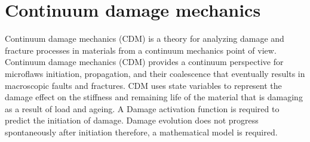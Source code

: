 \documentclass[a4paper,12pt,twoside]{report}
\begin{document}
\chapter{Continuum damage mechanics}
\indent\indent\indent Continuum damage mechanics (CDM) is a theory for analyzing damage and fracture processes in materials from a continuum mechanics point of view. Continuum damage mechanics (CDM) provides a continuum perspective for microflaws initiation, propagation, and their coalescence that eventually results in macroscopic faults and fractures. CDM uses state variables to represent the damage effect on the stiffness and remaining life of the material that is damaging as a result of load and ageing. A Damage activation function is required to predict the initiation of damage. Damage evolution does not progress spontaneously after initiation therefore, a mathematical model is required.  
\end{document}
